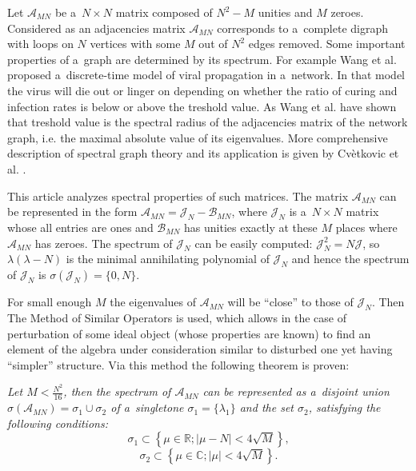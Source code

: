 Let \( \mathscr{A}_{MN} \) be a~\( N\times N \) matrix composed of
\( N^2 - M \) unities and \( M \) zeroes.
Considered as an adjacencies matrix \( \mathscr{A}_{MN} \)
corresponds to a~complete digraph with loops on \( N \) vertices
with some \( M \) out of \( N^2 \) edges removed.
Some important properties of a~graph are determined by its spectrum.
For example Wang et al. \cite{epidemic} proposed a~discrete-time model
of viral propagation in a~network.
In that model the virus will die out or linger on
depending on whether the ratio of curing and infection rates
is below or above the treshold value.
As Wang et al. have shown that treshold value
is the spectral radius of the adjacencies matrix of the network graph,
i.e. the maximal absolute value of its eigenvalues.
More comprehensive description of spectral graph theory
and its application is given by Cv\`etkovic et al. \cite{cvet}.

This article analyzes spectral properties of such matrices.
The matrix \( \mathscr{A}_{MN} \) can be represented in the form
\( \mathscr{A}_{MN} = \mathcal{J}_N - \mathscr{B}_{MN} \),
where \( \mathcal{J}_N \) is a~\( N\times N \) matrix
whose all entries are ones
and \( \mathcal{B}_{MN} \) has unities exactly at these \( M \)
places where \( \mathscr{A}_{MN} \) has zeroes.
The spectrum of \( \mathcal{J}_N \) can be easily computed:
\( \mathcal{J}_N^2 = N \mathcal{J} \),
so \( \lambda(\lambda - N) \) is the minimal
annihilating polynomial of \( \mathcal{J}_N \)
and hence the spectrum of \( \mathcal{J}_{N} \) is
\( \sigma(\mathcal{J}_N) = \{ 0,N \} \).

For small enough \( M \) the eigenvalues of \( \mathscr{A}_{MN} \)
will be ``close'' to those of \( \mathcal{J}_N \).
Then The Method of Similar Operators \cite{baskakov-harmonic,baskakov-split} is used,
which allows in the case of perturbation of some ideal object (whose properties are known)
to find an element of the algebra under consideration similar to disturbed one
yet having ``simpler'' structure.
Via this method the following theorem is proven:
\begin{center}
\it
    Let \( M < \frac{N^2}{16} \),
    then the spectrum of \( \mathscr{A}_{MN} \) can be represented as a~disjoint union
    \( \sigma\left(\mathscr{A}_{MN}\right) = \sigma_1 \cup \sigma_2 \)
    of a~singletone \( \sigma_1=\{\lambda_1\} \)
    and the set \( \sigma_2 \), satisfying the following conditions:
    \[ \sigma_1 \subset \left\{ \mu\in\mathbb{R}; \lvert \mu - N \rvert < 4\sqrt{M} \right\}, \]
    \[ \sigma_2 \subset \left\{ \mu\in\mathbb{C}; \lvert \mu \rvert < 4\sqrt{M} \right\}. \]
\end{center}
